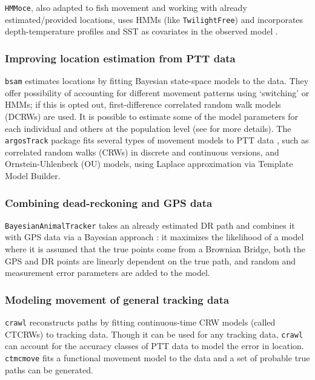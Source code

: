 \documentclass[a4paper,12pt]{article}
\newcommand{\Rpkg}[1]{\texttt{#1}}
\begin{document}
\Rpkg{HMMoce}, also adapted to fish movement and working with already estimated/provided locations, uses HMMs (like \Rpkg{TwilightFree}) and incorporates depth-temperature profiles and SST as covariates in the observed model \citep{Braun2017}. 

\subsubsection*{Improving location estimation from PTT data}

\Rpkg{bsam} estimates locations by fitting Bayesian state-space models to the data. They offer possibility of accounting for different movement patterns using `switching' or HMMs; if this is opted out, first-difference correlated random walk models (DCRWs) are used. It is possible to estimate some of the model parameters for each individual and others at the population level (see \cite{Jonsen2013,Jonsen2016} for more details). The \Rpkg{argosTrack} package fits several types of movement models to PTT data \citep{Albertsen2015}, such as correlated random walks (CRWs) in discrete and continuous versions, and Ornstein-Uhlenbeck (OU) models, using Laplace approximation via Template Model Builder. 

\subsubsection*{Combining dead-reckoning and GPS data}

\Rpkg{BayesianAnimalTracker} takes an already estimated DR path and combines it with GPS data via a Bayesian approach \citep{Liu2016}: it maximizes the likelihood of a model where it is assumed that the true points come from a Brownian Bridge, both the GPS and DR points are linearly dependent on the true path, and random and measurement error parameters are added to the model.

\subsubsection*{Modeling movement of general tracking data}

\Rpkg{crawl} reconstructs paths by fitting continuous-time CRW models (called CTCRWs) \citep{Johnson2008} to tracking data. Though it can be used for any tracking data, \Rpkg{crawl} can account for the accuracy classes of PTT data to model the error in location. \Rpkg{ctmcmove} fits a functional movement model \citep{Buderman2016} to the data and a set of probable true paths can be generated. 
\end{document}
